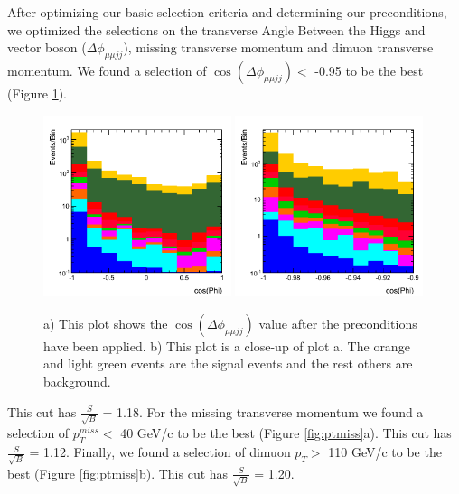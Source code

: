 \documentclass[12pt]{article}
\begin{document}
After optimizing our basic selection criteria and determining our preconditions, 
we optimized the selections on the transverse Angle Between the Higgs and vector boson ($\Delta\phi_{\mu\mu jj}$), 
missing transverse momentum and dimuon transverse momentum. 
We found a selection of $\cos(\Delta\phi_{\mu\mu jj})<$ -0.95 to be the best (Figure \ref{fig:cosPhi}).
\begin{figure}[!hbtp]
\begin{center}
    \includegraphics[width=0.49\textwidth]{images/Hist_MuMu2JetPhiBeforeCuts.png} %
    \includegraphics[width=0.49\textwidth]{images/Hist_MuMu2JetPhiZoomB4Cut.png}
    \caption{ \label{fig:cosPhi}
         a) This plot shows the $\cos(\Delta\phi_{\mu\mu jj})$ value after the preconditions have been applied. b) This plot is a close-up of plot a.
	 The orange and light green events are the signal events and the rest others are background.
      }
\end{center}
\end{figure} 
This cut has $\frac{S}{\sqrt{B}}$ = 1.18. For the missing transverse momentum we found a selection of 
$p_{T}^{miss} <$ 40 GeV/c to be the best (Figure \ref{fig:ptmiss}a).
This cut has $\frac{S}{\sqrt{B}}$ = 1.12. Finally, we found a selection of dimuon $p_{T} >$ 110 GeV/c to be the best 
(Figure \ref{fig:ptmiss}b). This cut has $\frac{S}{\sqrt{B}}$ = 1.20. 
\end{document}
